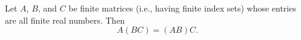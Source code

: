Let $A$, $B$, and $C$ be finite matrices (i.e., having finite index sets) whose entries are all finite real numbers. Then
$$A(BC) = (AB)C.$$
